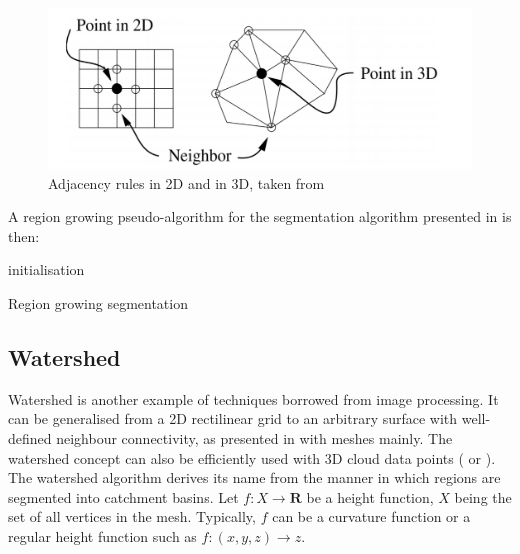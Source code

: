 \documentclass{kththesis}
\begin{document}
\begin{figure}[H]
    \centering
    \includegraphics[width=\textwidth]{images/neighbors.png}
    \caption{Adjacency rules in 2D and in 3D, taken from \parencite{ManganMeshWatershed}}
    \label{fig:neighbors}
\end{figure}

A region growing pseudo-algorithm for the segmentation algorithm presented in \parencite{PageRegionGrowing} is then:  \\
\begin{algorithm}[H]
 initialisation\;
 \caption{Region growing segmentation}
\end{algorithm}
\subsection{Watershed} 
Watershed is another example of techniques borrowed from image processing. It can be generalised from a 2D rectilinear grid to an arbitrary surface with well-defined neighbour connectivity, as presented in \textcite{ManganMeshWatershed} with meshes mainly. The watershed concept can also be efficiently used with 3D cloud data points (\textcite{det_seg_class} or \textcite{HernandezArtefacts}). \\
The watershed algorithm derives its name from the manner
in which regions are segmented into catchment basins. 
Let $f:X\rightarrow\mathbf{R}$ be a height function, $X$ being the set of all vertices in the mesh. Typically, $f$ can be a curvature function or a regular height function such as $f:(x,y,z)\rightarrow z$. \\
\end{document}
